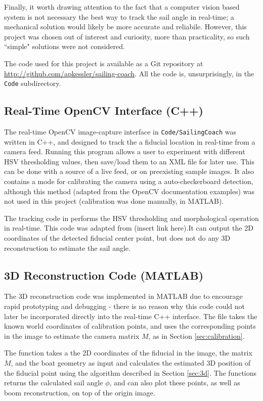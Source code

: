\documentclass[letterpaper, 10 pt, conference]{ieeeconf}  %
\begin{document}
Finally, it worth drawing attention to the fact that a computer vision based system is not necessary the best way to track the sail angle in real-time; a mechanical solution would likely be more accurate and reliabile. However, this project was chosen out of interest and curiosity, more than practicality, so such ``simple" solutions were not considered. 

{}



\appendix
The code used for this project is available as a Git repository at \url{http://github.com/apkessler/sailing-coach}. All the code is, unsurprisingly, in the \verb=Code= subdirectory. 
\subsection{Real-Time OpenCV Interface (C++)}
The real-time OpenCV image-capture interface in \verb=Code/SailingCoach= was written in C++, and designed to track the a fiducial location in real-time from a camera feed. Running this program allows a user to experiment with different HSV thresholding values, then save/load them to an XML file for later use. This can be done with a source of a live feed, or on preexisting sample images. It also contains a mode for calibrating the camera using a auto-checkerboard detection, although this method (adapted from the OpenCV documentation examples) was not used in this project (calibration was done manually, in MATLAB). 

The tracking code in  performs the HSV thresholding and morphological operation in real-time. This code was adapted from (insert link here).It can output the 2D coordinates of the detected fiducial center point, but does not do any 3D reconstruction to estimate the sail angle.

\subsection{3D Reconstruction Code (MATLAB)}
The 3D reconstruction code was implemented in MATLAB due to encourage rapid prototyping and debugging - there is no reason why this code could not later be incorporated directly into the real-time C++ interface.
The file  takes the known world coordinates of calibration points, and uses the corresponding points in the image to estimate the camera matrix $M$, as in Section \ref{sec:calibration}.

The function  takes a the 2D coordinates of the fiducial in the image, the matrix $M$, and the boat geometry as input and calculates the estimated 3D position of the fiducial point using the algorithm described in Section \ref{sec:3d}. The functions returns the calculated sail angle $\phi$, and can also plot these points, as well as boom reconstruction, on top of the origin image. 
\end{document}
